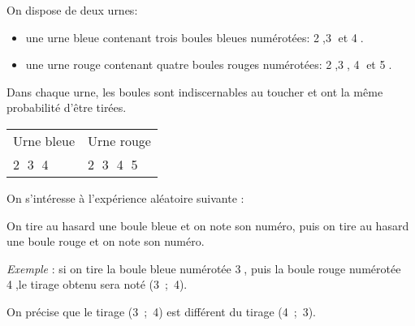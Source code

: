 
\medskip

On dispose de deux urnes:

\begin{itemize}
\item une urne bleue contenant trois boules bleues numérotées: \textcircled{2},\textcircled{3} et \textcircled{4}.
\item une urne rouge contenant quatre boules rouges numérotées: \textcircled{2},\textcircled{3}, \textcircled{4} et \textcircled{5}.
\end{itemize}

Dans chaque urne, les boules sont indiscernables au toucher et ont la même probabilité d'être tirées.

\begin{center}
\begin{tabularx}{\linewidth}{|*{2}{>{\centering \arraybackslash}X|}}\hline
Urne bleue &Urne rouge\\
\textcircled{2} \textcircled{3}  \textcircled{4}& \textcircled{2} \textcircled{3} \textcircled{4}  \textcircled{5}\\ \hline
\end{tabularx}
\end{center}
\medskip

On s'intéresse à l'expérience aléatoire suivante :

\og On tire au hasard une boule bleue et on note son numéro, puis on tire au hasard une boule rouge et on note son numéro. \fg

\emph{Exemple} : si on tire la boule bleue numérotée \textcircled{3}, puis la boule rouge numérotée \textcircled{4},le tirage obtenu sera noté (3~;~4).

On précise que le tirage (3~;~4) est différent du tirage (4~;~3).

\medskip

